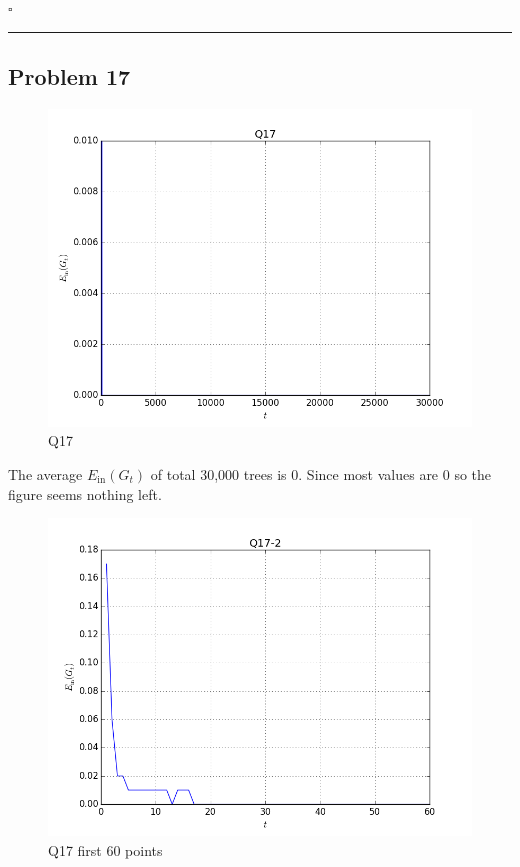 \documentclass[12pt]{article}
\newcommand*{\QEDB}{\hfill\ensuremath{\square}}
\newcommand{\ParTh}[1]{\left(#1\right)}
\newcommand{\horrule}[1]{\rule{\linewidth}{#1}}
\begin{document}
\QEDB

\horrule{0.5pt}

\subsection*{Problem 17}

\begin{figure}[H]
	\centering
	\includegraphics[scale=0.6]{Q17.png}
	\caption{Q17}
	\label{Q17}
\end{figure}
The average $E_{\text{in}}\ParTh{G_t}$ of total 30,000 trees is $0$. Since most values are 0 so the figure seems nothing left.
\begin{figure}[H]
	\centering
	\includegraphics[scale=0.6]{Q17-2.png}
	\caption{Q17 first 60 points}
	\label{Q17-2}
\end{figure}
\end{document}
